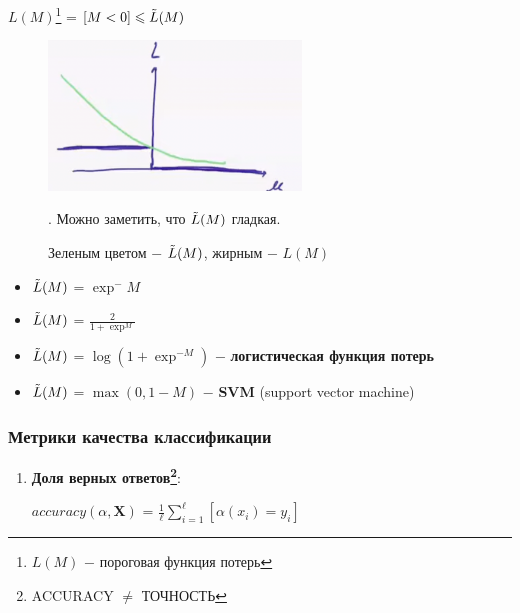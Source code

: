             \begin{center}
                $L(M)$\footnote{$L(M)$ $-$ пороговая функция потерь} = $[M < 0] \leq \Tilde{L}(M)$  
            \end{center}


            \begin{figure}[H]
                \centering
                \includegraphics[width=0.6\textwidth]{images/4lecture/LinearClassification3.png}
                \caption{Зеленым цветом $-$ $\Tilde{L}(M)$, жирным $-$ $L(M)$}. Можно заметить, что $\Tilde{L}(M)$ гладкая.
            \end{figure}

            \begin{center}
                \begin{itemize}
                    \item $\Tilde{L}(M)$ = $\exp^-M$
                    \item $\Tilde{L}(M)$ = $\frac{2}{1 + \exp^M}$
                    \item $\Tilde{L}(M)$ = $\log(1 + \exp^{-M})$ $-$ \textbf{логистическая функция потерь}
                    \item $\Tilde{L}(M)$ = $\max(0, 1 - M)$ $-$ \textbf{SVM} (support vector machine)
                \end{itemize}   
            \end{center}

        \subsubsection{Метрики качества классификации}
            \begin{enumerate}
                \item \textbf{Доля верных ответов\footnote{ACCURACY $\neq$ ТОЧНОСТЬ}}:
                    \begin{center}
                        $accuracy(\alpha, \mathbf{X})$ = $\frac{1}{\ell} \sum\limits_{i = 1}^\ell [\alpha(x_i) = y_i]$
                    \end{center}
            \end{enumerate}


